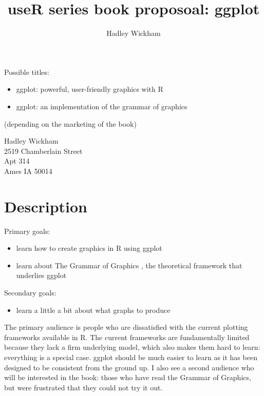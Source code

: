 \documentclass[oneside,letterpaper]{scrartcl}
\title{useR series book proposoal: ggplot}
\author{Hadley Wickham}
\begin{document}
\maketitle

Possible titles:

\begin{itemize}
  \item ggplot: powerful, user-friendly graphics with R
  \item ggplot: an implementation of the grammar of graphics
\end{itemize}

(depending on the marketing of the book)

Hadley Wickham \\
2519 Chamberlain Street \\
Apt 314 \\
Ames IA 50014 \\

\section{Description}\label{sec:description}


Primary goals:

\begin{itemize}
  \item learn how to create graphics in R using ggplot
  \item learn about The Grammar of Graphics \citep{wilkinson:2006}, the theoretical framework that underlies ggplot
\end{itemize}

\noindent Secondary goals:

\begin{itemize}
  \item learn a little a bit about what graphs to produce
\end{itemize}

The primary audience is people who are dissatisfied with the current plotting frameworks available in R.  The current frameworks are fundamentally limited because they lack a firm underlying model, which also makes them hard to learn: everything is a special case.  ggplot should be much easier to learn as it has been designed to be consistent from the ground up.  I also see a second audience who will be interested in the book: those who have read the Grammar of Graphics, but were frustrated that they could not try it out.  
\end{document}
